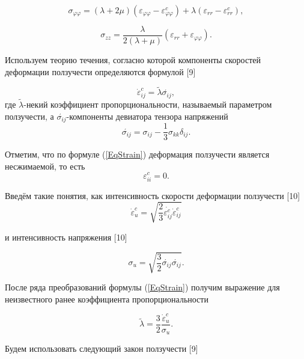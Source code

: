 \documentclass[a4paper,14pt]{extarticle}
\begin{document}
\begin{equation*}
\sigma_{\varphi\varphi}=(\lambda+2\mu)(\varepsilon_{\varphi\varphi}-\varepsilon_{\varphi\varphi}^{c})+\lambda(\varepsilon_{rr}-\varepsilon_{rr}^{c}),
\end{equation*}

\begin{equation*}
\sigma_{zz}=\dfrac{\lambda}{2(\lambda+\mu)}(\varepsilon_{rr}+\varepsilon_{\varphi\varphi}).
\end{equation*}

Используем теорию течения, согласно которой компоненты скоростей деформации ползучести определяются формулой [9]

\begin{equation}\label{EqStrain}
\dot{\varepsilon}_{ij}^{c}=\tilde{\lambda}\acute{\sigma_{ij}},
\end{equation}
где $\tilde{\lambda}$-некий коэффициент пропорциональности, называемый параметром ползучести, а $\acute{\sigma_{ij}}$-компоненты девиатора тензора напряжений
\begin{equation}
\acute{\sigma_{ij}}=\sigma_{ij}-\frac{1}{3}\sigma_{kk}\delta_{ij}.
\end{equation}

Отметим, что по формуле (\ref{EqStrain}) деформация ползучести является несжимаемой, то есть 
\begin{equation}
\varepsilon_{ii}^{c}=0.
\end{equation}

Введём такие понятия, как интенсивность скорости деформации ползучести [10]
\begin{equation}
\dot{\varepsilon}_{u}^{c}=\sqrt{\dfrac{2}{3}\dot{\varepsilon_{ij}^{c}}\dot{\varepsilon}_{ij}^{c}}
\end{equation}

и интенсивность напряжения [10]

\begin{equation}\label{EffectiveSigma}
\sigma_{u}=\sqrt{\dfrac{3}{2}\acute{\sigma_{ij}}\acute{\sigma_{ij}}}.
\end{equation}

После ряда преобразований формулы (\ref{EqStrain}) получим выражение для неизвестного ранее коэффициента пропорциональности

\begin{equation}
\tilde{\lambda}=\dfrac{3}{2}\dfrac{\dot{\varepsilon}_{u}^{c}}{\sigma_{u}}.
\end{equation}

Будем использовать следующий закон ползучести [9]
\end{document}
